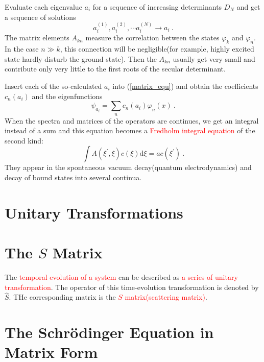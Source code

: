 \documentclass[11pt,a4paper]{article}
\newcommand{\dif}{\mathrm{d}}
\begin{document}
Evaluate each eigenvalue $a_i$ for a sequence of increasing determinants $D_N$ and get a sequence of solutions 
\begin{equation}
a_i^{(1)}, a_i^{(2)}, \cdots a_i^{(N)} \rightarrow a_i ~.
\end{equation}
The matrix elements $A_{kn}$ measure the correlation between the states $\varphi_k$ and $\varphi_n$. In the case $n \gg k$, this connection will be negligible(for example, highly excited state hardly disturb the ground state). Then the $A_{kn}$ usually get very small and contribute only very little to the first roots of the secular determinant.

Insert each of the so-calculated $a_i$ into (\ref{matrix_equ}) and obtain the coefficients $c_n(a_i)$ and the eigenfunctions
\begin{equation}
\psi_{a_i} = \sum_n c_n(a_i) \varphi_n(x) ~.
\end{equation}
When the spectra and matrices of the operators are continues, we get an integral instead of a sum and this equation becomes a \textcolor{red}{Fredholm integral equation} of the second kind:
\begin{equation}
\int A(\xi^\prime, \xi) c(\xi) \dif \xi = a c(\xi^\prime) ~.
\end{equation}
They appear in the spontaneous vacuum decay(quantum electrodynamics) and decay of bound states into several continua.


\section{Unitary Transformations}









\section{The $S$ Matrix}
The \textcolor{red}{temporal evolution of a system} can be described as \textcolor{red}{a series of unitary transformation}. The operator of this time-evolution transformation is denoted by $\hat{S}$. THe corresponding matrix is the \textcolor{red}{$S$ matrix(scattering matrix)}. 










\section{The Schr\"odinger Equation in Matrix Form}
\end{document}
